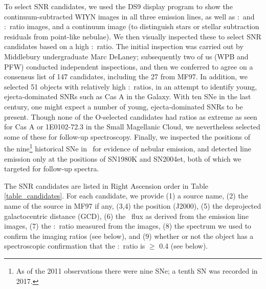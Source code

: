
To select SNR candidates, we used the DS9 display program to show the continuum-subtracted WIYN images in all three emission lines, as well as \sii:\ha\  and \oiii:\ha\ ratio images, and a continuum image (to distinguish stars  or stellar subtraction residuals from point-like nebulae).   We then visually inspected these to select SNR candidates based on a high  \sii:\ha\ ratio.  The initial inspection was carried out by Middlebury undergraduate Marc DeLaney; subsequently two of us (WPB and PFW) conducted independent inspections, and then we conferred to agree on a consensus list of 147 candidates, including the 27 from MF97.   In addition, we selected 51 objects with relatively high \oiii:\ha\ ratios, in an attempt to identify young, ejecta-dominated SNRs such as Cas A in the Galaxy. With ten SNe in the last century, one might expect a number of young, ejecta-dominated SNRs to be present.  Though none of the O-selected candidates had ratios as extreme as seen for Cas A or 1E0102-72.3 in the Small Magellanic Cloud, we nevertheless selected some of these for follow-up spectroscopy.  Finally, we inspected the positions of the nine\footnote{As of the 2011 observations there were nine SNe; a tenth SN was recorded in 2017.} historical SNe in \gal\ for evidence of nebular emission, and detected line emission only at the positions of SN1980K and SN2004et, both of which we targeted for follow-up spectra.


The SNR candidates are listed in Right Ascension order in Table \ref{table_candidates}.  For each candidate, we provide (1) a source name, (2) the name of the source in MF97 if any,  (3,4) the position  (J2000), (5) the deprojected galactocentric distance (GCD), (6) the \ha\ flux as derived from the emission line images, (7) the \sii:\ha\ ratio measured from the images, (8) the spectrum we used to confirm the imaging ratios (see below), and (9) whether or not the object has a spectroscopic confirmation that the  \sii:\ha\ ratio is $\ge$ 0.4 (see below).

